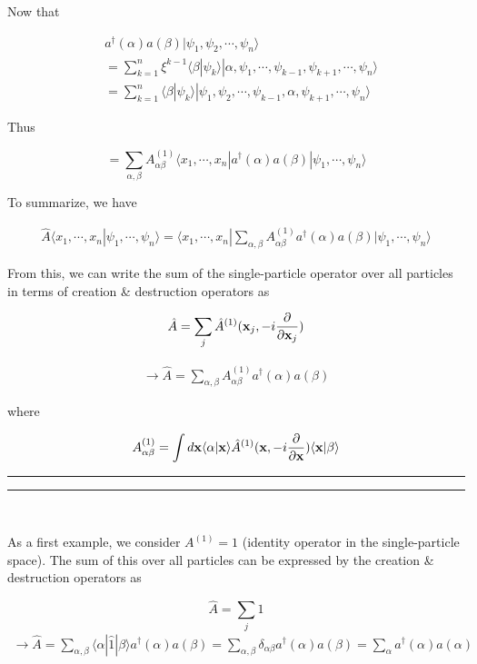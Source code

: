 Now that

\[\begin{split}
&a^\dagger(\alpha) a(\beta)|\psi_1,\psi_2,\cdots,\psi_n\rangle \\
&= \sum_{k=1}^n\xi^{k-1}\langle \beta|\psi_k\rangle|\alpha,\psi_1,\cdots,\psi_{k-1},\psi_{k+1},\cdots,\psi_n\rangle\\
&=\sum_{k=1}^n\langle\beta|\psi_k\rangle|\psi_1,\psi_2,\cdots,\psi_{k-1},\alpha,\psi_{k+1},\cdots,\psi_n\rangle
\end{split}\]

Thus

\[=\sum_{\alpha,\beta}A_{\alpha\beta}^{(1)}\langle x_1,\cdots,x_n|a^\dagger(\alpha)a(\beta)|\psi_1,\cdots,\psi_n\rangle \]

To summarize, we have

\begin{align}
\hat{A}\langle x_1,\cdots,x_n|\psi_1,\cdots,\psi_n\rangle = \langle x_1,\cdots,x_n|\sum_{\alpha,\beta}A_{\alpha\beta}^{(1)}a^\dagger(\alpha)a(\beta)|\psi_1,\cdots,\psi_n\rangle
\end{align}

From this, we can write the sum of the single-particle operator over all particles in terms of creation \& destruction operators as 

\[\hat{A} = \sum_j\hat{A}^{(1)}({\bf x}_j,-i\frac{\partial}{\partial {\bf x}_j}) \]

\begin{align}\label{eqs1.7.6}
\rightarrow \hat{A} = \sum_{\alpha,\beta} A^{(1)}_{\alpha\beta}a^\dagger(\alpha)a(\beta)
\end{align}

where

\[A^{(1)}_{\alpha\beta} = \int d{\bf x} \langle\alpha|{\bf x}\rangle\hat{A}^{(1)}({\bf x}, -i\frac{\partial}{\partial{\bf x}})\langle{\bf x}|\beta\rangle\]

\hrule
\smallskip
\hrule


\ 

As a first example, we consider $A^{(1)} = 1$ (identity operator in the single-particle space). The sum of this over all particles can be expressed by the creation \& destruction operators as 

\[\hat{A} = \sum_j \hat{1}\]
\begin{align}
\rightarrow\hat{A} = \sum_{\alpha,\beta}\langle\alpha|\hat{1}|\beta\rangle a^\dagger(\alpha)a(\beta) = \sum_{\alpha,\beta}\delta_{\alpha\beta}a^\dagger(\alpha)a(\beta) = \sum_\alpha a^\dagger(\alpha)a(\alpha)
\end{align}

